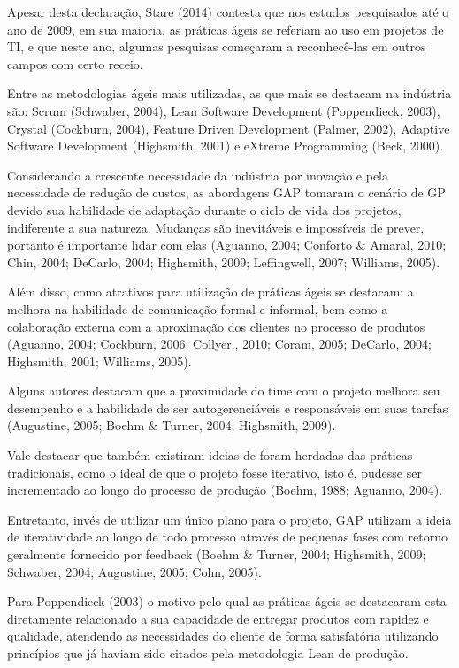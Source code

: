 Apesar desta declaração, Stare (2014) contesta que nos estudos pesquisados até o ano de 2009, em sua maioria, as práticas ágeis se referiam ao uso em projetos de TI, e que neste ano, algumas pesquisas começaram a reconhecê-las em outros campos com certo receio.

Entre as metodologias ágeis mais utilizadas, as que mais se destacam na indústria são: Scrum (Schwaber, 2004), Lean Software Development (Poppendieck, 2003), Crystal (Cockburn, 2004), Feature Driven Development (Palmer, 2002), Adaptive Software Development (Highsmith, 2001) e eXtreme Programming (Beck, 2000).

Considerando a crescente necessidade da indústria por inovação e pela necessidade de redução de custos, as abordagens GAP tomaram o cenário de GP devido sua habilidade de adaptação durante o ciclo de vida dos projetos, indiferente a sua natureza. Mudanças são inevitáveis e impossíveis de prever, portanto é importante lidar com elas (Aguanno, 2004; Conforto \& Amaral, 2010; Chin, 2004; DeCarlo, 2004; Highsmith, 2009; Leffingwell, 2007; Williams, 2005).

Além disso, como atrativos para utilização de práticas ágeis se destacam: a melhora na habilidade de comunicação formal e informal, bem como a colaboração externa com a aproximação dos clientes no processo de produtos (Aguanno, 2004; Cockburn, 2006; Collyer., 2010; Coram, 2005; DeCarlo, 2004; Highsmith, 2001; Williams, 2005).

Alguns autores destacam que a proximidade do time com o projeto melhora seu desempenho e a habilidade de ser autogerenciáveis e responsáveis em suas tarefas (Augustine, 2005; Boehm \& Turner, 2004; Highsmith, 2009).

Vale destacar que também existiram ideias de foram herdadas das práticas tradicionais, como o ideal de que o projeto fosse iterativo, isto é, pudesse ser incrementado ao longo do processo de produção (Boehm, 1988; Aguanno, 2004).

Entretanto, invés de utilizar um único plano para o projeto, GAP utilizam a ideia de iteratividade ao longo de todo processo através de pequenas fases com retorno geralmente fornecido por feedback (Boehm \& Turner, 2004; Highsmith, 2009; Schwaber, 2004; Augustine, 2005; Cohn, 2005).

Para Poppendieck (2003) o motivo pelo qual as práticas ágeis se destacaram esta diretamente relacionado a sua capacidade de entregar produtos com rapidez e qualidade, atendendo as necessidades do cliente de forma satisfatória utilizando princípios que já haviam sido citados pela metodologia Lean de produção.


